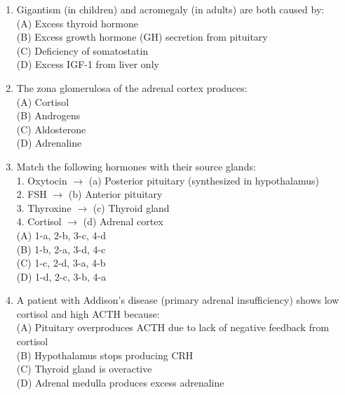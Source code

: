 \documentclass{article}
\begin{document}
\begin{enumerate}[label=Q\arabic*.]
\item Gigantism (in children) and acromegaly (in adults) are both caused by:
\\(A) Excess thyroid hormone
\\(B) Excess growth hormone (GH) secretion from pituitary
\\(C) Deficiency of somatostatin
\\(D) Excess IGF-1 from liver only

\item The zona glomerulosa of the adrenal cortex produces:
\\(A) Cortisol
\\(B) Androgens
\\(C) Aldosterone
\\(D) Adrenaline

\item Match the following hormones with their source glands:\\
1. Oxytocin $\rightarrow$ (a) Posterior pituitary (synthesized in hypothalamus)\\
2. FSH $\rightarrow$ (b) Anterior pituitary\\
3. Thyroxine $\rightarrow$ (c) Thyroid gland\\
4. Cortisol $\rightarrow$ (d) Adrenal cortex
\\(A) 1-a, 2-b, 3-c, 4-d
\\(B) 1-b, 2-a, 3-d, 4-c
\\(C) 1-c, 2-d, 3-a, 4-b
\\(D) 1-d, 2-c, 3-b, 4-a

\item A patient with Addison's disease (primary adrenal insufficiency) shows low cortisol and high ACTH because:
\\(A) Pituitary overproduces ACTH due to lack of negative feedback from cortisol
\\(B) Hypothalamus stops producing CRH
\\(C) Thyroid gland is overactive
\\(D) Adrenal medulla produces excess adrenaline

\end{enumerate}
\end{document}
